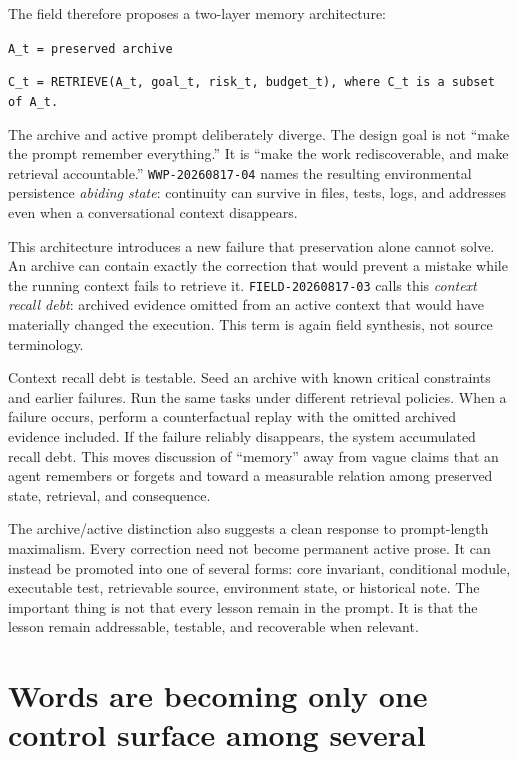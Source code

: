 \documentclass[11pt]{article}
\newcommand{\zettel}[1]{\texttt{#1}}
\begin{document}
The field therefore proposes a two-layer memory architecture:

\begin{center}
\texttt{A\_t = preserved archive}\par
\texttt{C\_t = RETRIEVE(A\_t, goal\_t, risk\_t, budget\_t), where C\_t is a subset of A\_t.}
\end{center}

The archive and active prompt deliberately diverge. The design goal is not ``make the prompt remember everything.'' It is ``make the work rediscoverable, and make retrieval accountable.'' \zettel{WWP-20260817-04} names the resulting environmental persistence \emph{abiding state}: continuity can survive in files, tests, logs, and addresses even when a conversational context disappears.

This architecture introduces a new failure that preservation alone cannot solve. An archive can contain exactly the correction that would prevent a mistake while the running context fails to retrieve it. \zettel{FIELD-20260817-03} calls this \emph{context recall debt}: archived evidence omitted from an active context that would have materially changed the execution. This term is again field synthesis, not source terminology.

Context recall debt is testable. Seed an archive with known critical constraints and earlier failures. Run the same tasks under different retrieval policies. When a failure occurs, perform a counterfactual replay with the omitted archived evidence included. If the failure reliably disappears, the system accumulated recall debt. This moves discussion of ``memory'' away from vague claims that an agent remembers or forgets and toward a measurable relation among preserved state, retrieval, and consequence.

The archive/active distinction also suggests a clean response to prompt-length maximalism. Every correction need not become permanent active prose. It can instead be promoted into one of several forms: core invariant, conditional module, executable test, retrievable source, environment state, or historical note. The important thing is not that every lesson remain in the prompt. It is that the lesson remain addressable, testable, and recoverable when relevant.

\section{Words are becoming only one control surface among several}
\end{document}
